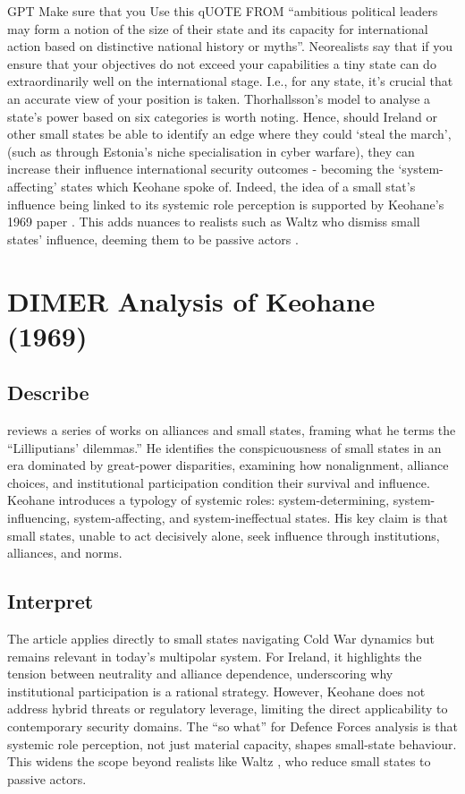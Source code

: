 GPT Make sure that you Use this qUOTE FROM \parencite{THORHALLSSON_2006} ``ambitious political leaders may form a notion of the size of their state and its capacity for international action based on distinctive national
history or myths''. Neorealists say that if you ensure that your objectives do not exceed your capabilities a tiny state can do extraordinarily well on the international stage. I.e., for any state, it's crucial that an accurate view of your position is taken. Thorhallsson's model to analyse a state's power based on six categories is worth noting. Hence, should Ireland or other small states be able to identify an edge where they could `steal the march', (such as through Estonia's niche specialisation in cyber warfare), they can increase their influence international security outcomes - becoming the `system-affecting' states which Keohane spoke of. Indeed, the idea of a small stat's influence being linked to its systemic role perception is supported by Keohane's 1969 paper \parencite{KEOHANE_1969}. This adds nuances to realists such as Waltz who dismiss small states' influence, deeming them to be passive actors \parencite{WALTZ_1979}. 

\section*{DIMER Analysis of Keohane (1969)}

\subsection*{Describe}
\textcite{KEOHANE_1969} reviews a series of works on alliances and small states, framing what he terms the “Lilliputians’ dilemmas.” He identifies the conspicuousness of small states in an era dominated by great-power disparities, examining how nonalignment, alliance choices, and institutional participation condition their survival and influence. Keohane introduces a typology of systemic roles: system-determining, system-influencing, system-affecting, and system-ineffectual states. His key claim is that small states, unable to act decisively alone, seek influence through institutions, alliances, and norms.

\subsection*{Interpret}
The article applies directly to small states navigating Cold War dynamics but remains relevant in today’s multipolar system. For Ireland, it highlights the tension between neutrality and alliance dependence, underscoring why institutional participation is a rational strategy. However, Keohane does not address hybrid threats or regulatory leverage, limiting the direct applicability to contemporary security domains. The “so what” for Defence Forces analysis is that systemic role perception, not just material capacity, shapes small-state behaviour. This widens the scope beyond realists like Waltz \parencite{WALTZ_1979}, who reduce small states to passive actors.

